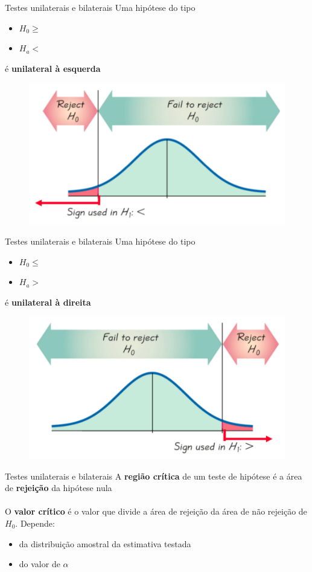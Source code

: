 \documentclass[10pt]{beamer}\usepackage[]{graphicx}\usepackage[]{color}
\theoremstyle{definition}
\begin{document}
\begin{frame}{Testes unilaterais e bilaterais}
  Uma hipótese do tipo
  \begin{itemize}
  \item[] $H_0 \geq $
  \item[] $H_a <$
  \end{itemize}
  é \textbf{unilateral à esquerda}
  \begin{figure}[H]
    \centering
    \includegraphics[width=.8\textwidth]{uni_esq2}
  \end{figure}
\end{frame}

\begin{frame}{Testes unilaterais e bilaterais}
  Uma hipótese do tipo
  \begin{itemize}
  \item[] $H_0 \leq $
  \item[] $H_a >$
  \end{itemize}
  é \textbf{unilateral à direita}
  \begin{figure}[H]
    \centering
    \includegraphics[width=.8\textwidth]{uni_dir2}
  \end{figure}
\end{frame}

\begin{frame}{Testes unilaterais e bilaterais}
  A \textbf{região crítica} de um teste de hipótese é a área de
  \textbf{rejeição} da hipótese nula\\~\\
  O \textbf{valor crítico} é o valor que divide a área de rejeição da
  área de não rejeição de $H_0$. Depende:
  \begin{itemize}
  \item da distribuição amostral da estimativa testada
  \item do valor de $\alpha$
  \end{itemize}
\end{frame}
\end{document}
